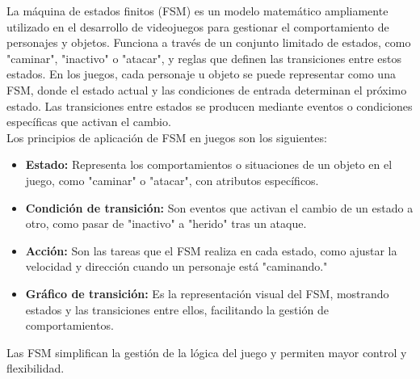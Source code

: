 \documentclass{article}
\begin{document}
La máquina de estados finitos (FSM) es un modelo matemático ampliamente utilizado en el desarrollo de videojuegos para gestionar el comportamiento de personajes y objetos. Funciona a través de un conjunto limitado de estados, como "caminar", "inactivo" o "atacar", y reglas que definen las transiciones entre estos estados. En los juegos, cada personaje u objeto se puede representar como una FSM, donde el estado actual y las condiciones de entrada determinan el próximo estado. Las transiciones entre estados se producen mediante eventos o condiciones específicas que activan el cambio.
\\

Los principios de aplicación de FSM en juegos son los siguientes:
\begin{itemize}
    \item \textbf{Estado:} Representa los comportamientos o situaciones de un objeto en el juego, como "caminar" o "atacar", con atributos específicos.
    \item \textbf{Condición de transición:} Son eventos que activan el cambio de un estado a otro, como pasar de "inactivo" a "herido" tras un ataque.
    \item \textbf{Acción:} Son las tareas que el FSM realiza en cada estado, como ajustar la velocidad y dirección cuando un personaje está "caminando."
    \item \textbf{Gráfico de transición:} Es la representación visual del FSM, mostrando estados y las transiciones entre ellos, facilitando la gestión de comportamientos.
\end{itemize}

Las FSM simplifican la gestión de la lógica del juego y permiten mayor control y flexibilidad.
\end{document}
